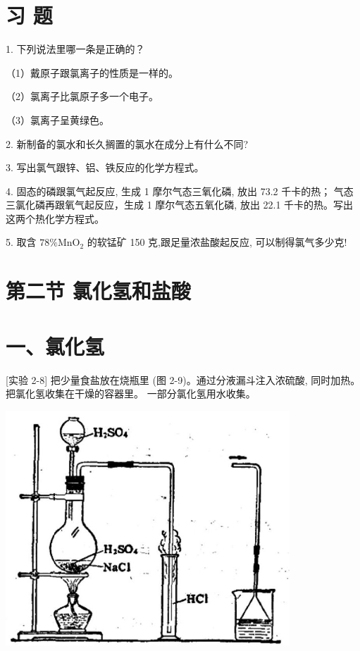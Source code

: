 \documentclass[10pt]{article}
\begin{document}
\section*{习 题}

1. 下列说法里哪一条是正确的？

（1）戴原子跟氯离子的性质是一样的。

（2）氯离子比氯原子多一个电子。

（3）氯离子呈黄绿色。

2. 新制备的氯水和长久搁置的氯水在成分上有什么不同?

3. 写出氯气跟锌、铝、铁反应的化学方程式。

4. 固态的磷跟氯气起反应, 生成 1 摩尔气态三氧化磷, 放出 73.2 千卡的热； 气态三氯化磷再跟氧气起反应，生成 1 摩尔气态五氧化磷, 放出 22.1 千卡的热。写出这两个热化学方程式。

5. 取含 \({78}\% {\mathrm{{MnO}}}_{2}\) 的软锰矿 150 克,跟足量浓盐酸起反应, 可以制得氯气多少克!

\section*{第二节 氯化氢和盐酸}

\section*{一、氯化氢}

[实验 2-8] 把少量食盐放在烧瓶里 (图 2-9)。通过分液漏斗注入浓硫酸, 同时加热。把氯化氢收集在干燥的容器里。 一部分氯化氢用水收集。

\begin{center}
\includegraphics[max width=0.8\textwidth]{images/01912d0f-097c-7e75-8f32-4f326cd86c9f_39_941677.jpg}
\end{center}
\end{document}
